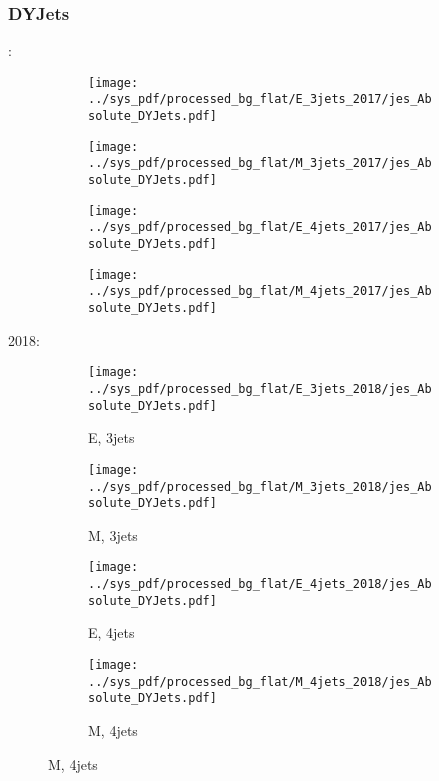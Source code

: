 \documentclass{beamer}
\begin{document}
\begin{frame}
\frametitle{DYJets}
\fontsize{5}{1}:
\begin{figure}
\centering
\begin{subfigure}[b]{0.24\textwidth}
\texttt{[image: ../sys\_pdf/processed\_bg\_flat/E\_3jets\_2017/jes\_Absolute\_DYJets.pdf]}
\end{subfigure}
\begin{subfigure}[b]{0.24\textwidth}
\texttt{[image: ../sys\_pdf/processed\_bg\_flat/M\_3jets\_2017/jes\_Absolute\_DYJets.pdf]}
\end{subfigure}
\begin{subfigure}[b]{0.24\textwidth}
\texttt{[image: ../sys\_pdf/processed\_bg\_flat/E\_4jets\_2017/jes\_Absolute\_DYJets.pdf]}
\end{subfigure}
\begin{subfigure}[b]{0.24\textwidth}
\texttt{[image: ../sys\_pdf/processed\_bg\_flat/M\_4jets\_2017/jes\_Absolute\_DYJets.pdf]}
\end{subfigure}
\end{figure}
2018:
\begin{figure}
\centering
\begin{subfigure}[b]{0.24\textwidth}
\texttt{[image: ../sys\_pdf/processed\_bg\_flat/E\_3jets\_2018/jes\_Absolute\_DYJets.pdf]}
\captionsetup{font=tiny}
\caption{E, 3jets}
\end{subfigure}
\begin{subfigure}[b]{0.24\textwidth}
\texttt{[image: ../sys\_pdf/processed\_bg\_flat/M\_3jets\_2018/jes\_Absolute\_DYJets.pdf]}
\captionsetup{font=tiny}
\caption{M, 3jets}
\end{subfigure}
\begin{subfigure}[b]{0.24\textwidth}
\texttt{[image: ../sys\_pdf/processed\_bg\_flat/E\_4jets\_2018/jes\_Absolute\_DYJets.pdf]}
\captionsetup{font=tiny}
\caption{E, 4jets}
\end{subfigure}
\begin{subfigure}[b]{0.24\textwidth}
\texttt{[image: ../sys\_pdf/processed\_bg\_flat/M\_4jets\_2018/jes\_Absolute\_DYJets.pdf]}
\captionsetup{font=tiny}
\caption{M, 4jets}
\end{subfigure}
\end{figure}
\end{frame}
\end{document}
